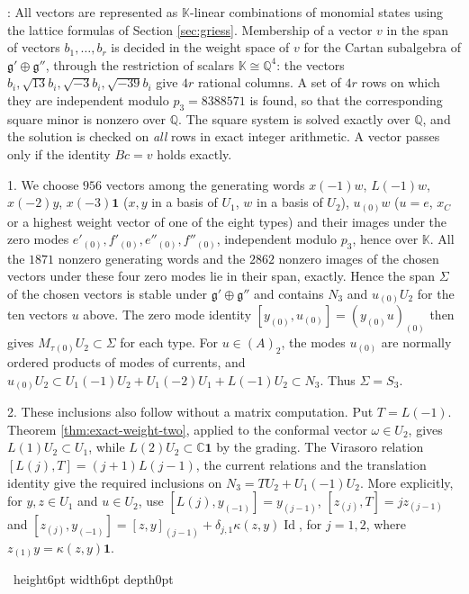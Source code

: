 \documentclass[leqno]{article}
\newcommand{\Cbb}{\ensuremath{\mathbb{C}}}
\newcommand{\K}{\ensuremath{\mathbb{K}}}
\newcommand{\qed}{\hfill \vrule height6pt  width6pt depth0pt}
\newenvironment{proof}[1][]{\noindent {\it Proof #1} : }{\hbox{~}\qed
\smallskip
}
\numberwithin{equation}{section}
\begin{document}
\begin{proof}
All vectors are represented as $\K$-linear combinations of monomial states using the lattice formulas of Section \ref{sec:griess}. Membership of a vector $v$ in the span of vectors $b_1, \dots, b_r$ is decided in the weight space of $v$ for the Cartan subalgebra of $\mathfrak g' \oplus \mathfrak g''$, through the restriction of scalars $\K \cong \mathbb{Q}^4$: the vectors $b_i, \sqrt{13} b_i, \sqrt{-3} b_i, \sqrt{-39} b_i$ give $4r$ rational columns. A set of $4r$ rows on which they are independent modulo $p_3 = 8388571$ is found, so that the corresponding square minor is nonzero over $\mathbb{Q}$. The square system is solved exactly over $\mathbb{Q}$, and the solution is checked on \emph{all} rows in exact integer arithmetic. A vector passes only if the identity $B c = v$ holds exactly.

1. We choose $956$ vectors among the generating words $x(-1)w$, $L(-1)w$, $x(-2)y$, $x(-3)\mathbf 1$ ($x,y$ in a basis of $U_1$, $w$ in a basis of $U_2$), $u_{(0)}w$ ($u = e$, $x_C$ or a highest weight vector of one of the eight types) and their images under the zero modes $e'_{(0)}, f'_{(0)}, e''_{(0)}, f''_{(0)}$, independent modulo $p_3$, hence over $\K$. All the $1871$ nonzero generating words and the $2862$ nonzero images of the chosen vectors under these four zero modes lie in their span, exactly. Hence the span $\Sigma$ of the chosen vectors is stable under $\mathfrak g' \oplus \mathfrak g''$ and contains $N_3$ and $u_{(0)}U_2$ for the ten vectors $u$ above. The zero mode identity $[y_{(0)}, u_{(0)}] = (y_{(0)}u)_{(0)}$ then gives $M_\tau{}_{(0)}U_2 \subset \Sigma$ for each type. For $u \in (A)_2$, the modes $u_{(0)}$ are normally ordered products of modes of currents, and $u_{(0)}U_2 \subset U_1(-1)U_2 + U_1(-2)U_1 + L(-1)U_2 \subset N_3$. Thus $\Sigma = S_3$.

2. These inclusions also follow without a matrix computation. Put $T = L(-1)$. Theorem \ref{thm:exact-weight-two}, applied to the conformal vector $\omega \in U_2$, gives $L(1)U_2 \subset U_1$, while $L(2)U_2 \subset \Cbb\mathbf 1$ by the grading. The Virasoro relation $[L(j),T] = (j+1)L(j-1)$, the current relations and the translation identity give the required inclusions on $N_3 = TU_2+U_1(-1)U_2$. More explicitly, for $y,z \in U_1$ and $u \in U_2$, use $[L(j),y_{(-1)}] = y_{(j-1)}$, $[z_{(j)},T] = jz_{(j-1)}$ and $[z_{(j)},y_{(-1)}] = [z,y]_{(j-1)}+\delta_{j,1}\kappa(z,y)\operatorname{Id}$, for $j = 1,2$, where $z_{(1)}y = \kappa(z,y)\mathbf 1$.


\end{proof}
\end{document}
